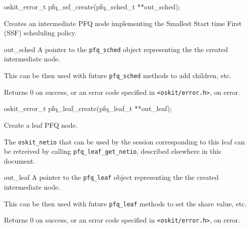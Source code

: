 \begin{apisyn}

	\funcproto oskit_error_t pfq_ssf_create(pfq_sched_t **out_sched);
\end{apisyn}
\begin{apidesc}
	Creates an intermediate PFQ node implementing the Smallest Start
	time First (SSF) scheduling policy.
\end{apidesc}
\begin{apiparm}
	\item[out_sched]
		A pointer to the \texttt{pfq_sched} object representing
		the the created intermediate node.

		This can be then used with future \texttt{pfq_sched}
		methods to add children, etc.
\end{apiparm}
\begin{apiret}
	Returns 0 on success, or an error code specified in
	\texttt{<oskit/error.h>}, on error.
\end{apiret}

\begin{apisyn}

	\funcproto oskit_error_t pfq_leaf_create(pfq_leaf_t **out_leaf);
\end{apisyn}
\begin{apidesc}
	Create a leaf PFQ node.

	The \texttt{oskit_netio} that can be used by the session
	corresponding to this leaf can be retreived by calling
	\texttt{pfq_leaf_get_netio}, described elsewhere in this document.
\end{apidesc}
\begin{apiparm}
	\item[out_leaf]
		A pointer to the \texttt{pfq_leaf} object representing
		the the created intermediate node.

		This can be then used with future \texttt{pfq_leaf}
		methods to set the share value, etc.
\end{apiparm}
\begin{apiret}
	Returns 0 on success, or an error code specified in
	\texttt{<oskit/error.h>}, on error.
\end{apiret}



